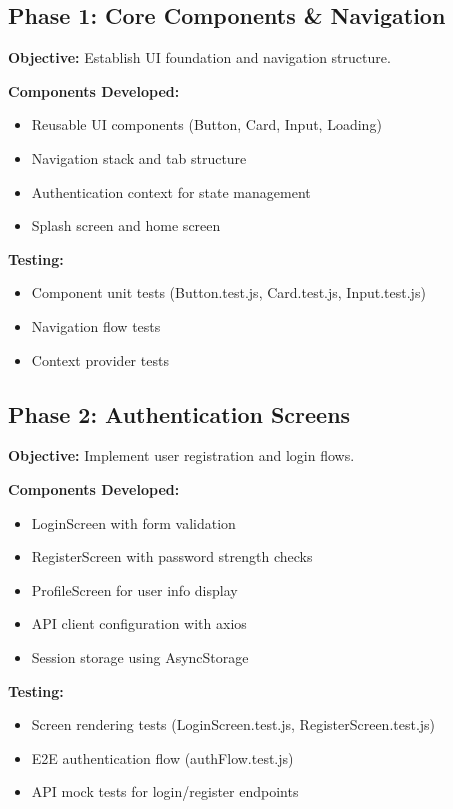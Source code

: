 \subsection{Phase 1: Core Components \& Navigation}
\label{subsec:frontend_phase1}

\textbf{Objective:} Establish UI foundation and navigation structure.

\textbf{Components Developed:}
\begin{itemize}
    \item Reusable UI components (Button, Card, Input, Loading)
    \item Navigation stack and tab structure
    \item Authentication context for state management
    \item Splash screen and home screen
\end{itemize}

\textbf{Testing:}
\begin{itemize}
    \item Component unit tests (Button.test.js, Card.test.js, Input.test.js)
    \item Navigation flow tests
    \item Context provider tests
\end{itemize}

\subsection{Phase 2: Authentication Screens}
\label{subsec:frontend_phase2}

\textbf{Objective:} Implement user registration and login flows.

\textbf{Components Developed:}
\begin{itemize}
    \item LoginScreen with form validation
    \item RegisterScreen with password strength checks
    \item ProfileScreen for user info display
    \item API client configuration with axios
    \item Session storage using AsyncStorage
\end{itemize}

\textbf{Testing:}
\begin{itemize}
    \item Screen rendering tests (LoginScreen.test.js, RegisterScreen.test.js)
    \item E2E authentication flow (authFlow.test.js)
    \item API mock tests for login/register endpoints
\end{itemize}

